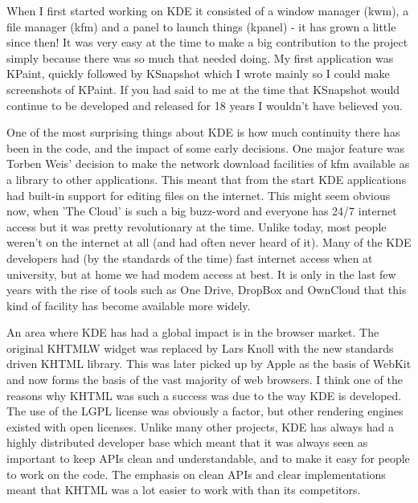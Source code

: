 

\noindent{}When I first started working on KDE it consisted of a window manager (kwm), a file manager (kfm) and a panel to launch things (kpanel) - it has grown a little since then! It was very easy at the time to make a big contribution to the project simply because there was so much that needed doing. My first application was KPaint, quickly followed by KSnapshot which I wrote mainly so I could make screenshots of KPaint. If you had said to me at the time that KSnapshot would continue to be developed and released for 18 years I wouldn't have believed you.

One of the most surprising things about KDE is how much continuity there has been in the code, and the impact of some early decisions. One major feature was Torben Weis' decision to make the network download facilities of kfm available as a library to other applications. This meant that from the start KDE applications had built-in support for editing files on the internet. This might seem obvious now, when 'The Cloud' is such a big buzz-word and everyone has 24/7 internet access but it was pretty revolutionary at the time. Unlike today, most people weren't on the internet at all (and had often never heard of it). Many of the KDE developers had (by the standards of the time) fast internet access when at university, but at home we had modem access at best. It is only in the last few years with the rise of tools such as One Drive, DropBox and OwnCloud that this kind of facility has become available more widely.

An area where KDE has had a global impact is in the browser market. The original KHTMLW widget was replaced by Lars Knoll with the new standards driven KHTML library. This was later picked up by Apple as the basis of WebKit and now forms the basis of the vast majority of web browsers. I think one of the reasons why KHTML was such a success was due to the way KDE is developed. The use of the LGPL license was obviously a factor, but other rendering engines existed with open licenses. Unlike many other projects, KDE has always had a highly distributed developer base which meant that it was always seen as important to keep APIs clean and understandable, and to make it easy for people to work on the code. The emphasis on clean APIs and clear implementations meant that KHTML was a lot easier to work with than its competitors.

